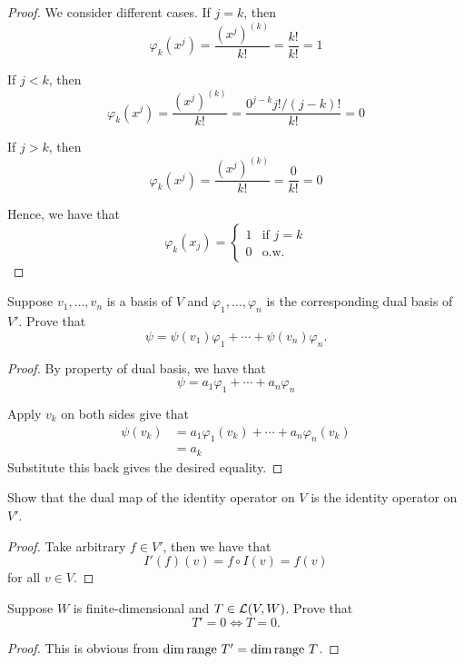 \documentclass{extarticle}
\begin{document}
\begin{proof}
We consider different cases. If \(j = k\), then 
\[\varphi_k(x^j) = \frac{(x^j)^{(k)}}{k!} = \frac{k!}{k!} = 1\]

If \(j < k\), then 
\[\varphi_k(x^j) = \frac{(x^j)^{(k)}}{k!} = \frac{0^{j-k}   j!/(j-k)!}{k!} = 0\]

If \(j > k\), then 
\[\varphi_k(x^j) = \frac{(x^j)^{(k)}}{k!} = \frac{0}{k!} = 0\]

Hence, we have that 
\[\varphi_k(x_j) = \begin{cases}
    1 & \text{if } j=k \\ 
    0 & \text{o.w.}
\end{cases}\]
\end{proof}

\begin{problem}{11} 
    Suppose \(v_1, \ldots, v_n\) is a basis of \(V\) and \(\varphi_1, \ldots, \varphi_n\) is 
    the corresponding dual basis of \(V'\). Prove that 
    \[\psi = \psi(v_1) \varphi_1 + \cdots + \psi(v_n) \varphi_n .\]
\end{problem}

\begin{proof}
By property of dual basis, we have that 
\[\psi = a_1 \varphi_1 + \cdots + a_n \varphi_n\]

Apply \(v_k\) on both sides give that 
\begin{align*}
    \psi(v_k) 
    & = a_1 \varphi_1 (v_k) + \cdots + a_n \varphi_n (v_k) \\ 
    & = a_k
\end{align*}
Substitute this back gives the desired equality. 
\end{proof}

\begin{problem}{13}
    Show that the dual map of the identity operator on \(V\) is the identity operator on \(V'\). 
\end{problem}

\begin{proof}
Take arbitrary \(f \in V'\), then we have that 
\[I'(f)(v) = f \circ I(v) = f(v)\]
for all \(v \in V\). 
\end{proof}

\begin{problem}{16}
    Suppose \(W\) is finite-dimensional and \(T \in \mathcal{L}(V, W)\). Prove that 
    \[T' = 0 \Longleftrightarrow T = 0.\]
\end{problem}

\begin{proof}
This is obvious from \(\dim \text{range } T' = \dim \text{range } T\). 
\end{proof}
\end{document}
